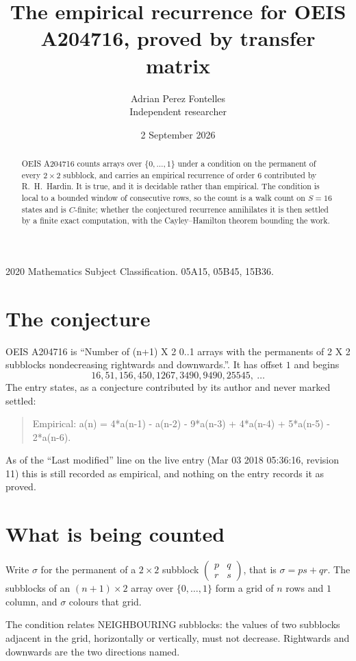 \documentclass[11pt,a4paper]{article}
\title{The empirical recurrence for OEIS A204716, proved by transfer matrix}
\author{Adrian Perez Fontelles\\ \small Independent researcher}
\date{2 September 2026}
\theoremstyle{plain}
\theoremstyle{definition}
\begin{document}
\maketitle

\begin{abstract}
OEIS A204716 counts arrays over $\{0,\dots,1\}$ under a condition on the permanent of every
$2\times2$ subblock, and carries an empirical recurrence of order $6$ contributed by
R.~H.~Hardin. It is true, and it is decidable rather than empirical. The condition is local to
a bounded window of consecutive rows, so the count is a walk count on $S=16$ states and is
$C$-finite; whether the conjectured recurrence annihilates it is then settled by a finite exact
computation, with the Cayley--Hamilton theorem bounding the work.
\end{abstract}

\noindent\small 2020 Mathematics Subject Classification. 05A15, 05B45, 15B36.\normalsize

\section{The conjecture}

OEIS A204716 is ``Number of (n+1) X 2 0..1 arrays with the permanents of 2 X 2 subblocks nondecreasing rightwards and downwards.''. It has offset $1$ and begins
\[
16, 51, 156, 450, 1267, 3490, 9490, 25545,\ \dots
\]
The entry states, as a conjecture contributed by its author and never marked settled:
\begin{quote}
Empirical: a(n) = 4*a(n-1) - a(n-2) - 9*a(n-3) + 4*a(n-4) + 5*a(n-5) - 2*a(n-6).
\end{quote}
As of the ``Last modified'' line on the live entry (Mar 03 2018 05:36:16, revision 11) this is still
recorded as empirical, and nothing on the entry records it as proved.

\section{What is being counted}

Write $\sigma$ for the permanent of a $2\times2$ subblock
$\begin{pmatrix}p&q\\r&s\end{pmatrix}$, that is $\sigma=ps+qr$. The subblocks of an
$(n+1)\times2$ array over $\{0,\dots,1\}$ form a grid of $n$ rows and $1$
column, and $\sigma$ colours that grid.

The condition relates NEIGHBOURING subblocks: the values of two subblocks adjacent in the grid,
horizontally or vertically, must not decrease. Rightwards and downwards are the two directions named.
\end{document}
